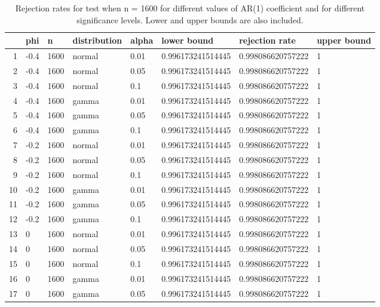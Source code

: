 \begin{table}[ht]
\centering
\caption{Rejection rates for test when n = 1600 for 
                   different values of AR(1) coefficient and for different 
                   significance levels. Lower and upper bounds are also 
                   included.} 
\label{table:rr_1600}
\begin{tabular}{rlllllll}
  \hline
 & phi & n & distribution & alpha & lower bound & rejection rate & upper bound \\ 
  \hline
1 & -0.4 & 1600 & normal & 0.01 & 0.996173241514445 & 0.998086620757222 & 1 \\ 
  2 & -0.4 & 1600 & normal & 0.05 & 0.996173241514445 & 0.998086620757222 & 1 \\ 
  3 & -0.4 & 1600 & normal & 0.1 & 0.996173241514445 & 0.998086620757222 & 1 \\ 
  4 & -0.4 & 1600 & gamma & 0.01 & 0.996173241514445 & 0.998086620757222 & 1 \\ 
  5 & -0.4 & 1600 & gamma & 0.05 & 0.996173241514445 & 0.998086620757222 & 1 \\ 
  6 & -0.4 & 1600 & gamma & 0.1 & 0.996173241514445 & 0.998086620757222 & 1 \\ 
  7 & -0.2 & 1600 & normal & 0.01 & 0.996173241514445 & 0.998086620757222 & 1 \\ 
  8 & -0.2 & 1600 & normal & 0.05 & 0.996173241514445 & 0.998086620757222 & 1 \\ 
  9 & -0.2 & 1600 & normal & 0.1 & 0.996173241514445 & 0.998086620757222 & 1 \\ 
  10 & -0.2 & 1600 & gamma & 0.01 & 0.996173241514445 & 0.998086620757222 & 1 \\ 
  11 & -0.2 & 1600 & gamma & 0.05 & 0.996173241514445 & 0.998086620757222 & 1 \\ 
  12 & -0.2 & 1600 & gamma & 0.1 & 0.996173241514445 & 0.998086620757222 & 1 \\ 
  13 & 0 & 1600 & normal & 0.01 & 0.996173241514445 & 0.998086620757222 & 1 \\ 
  14 & 0 & 1600 & normal & 0.05 & 0.996173241514445 & 0.998086620757222 & 1 \\ 
  15 & 0 & 1600 & normal & 0.1 & 0.996173241514445 & 0.998086620757222 & 1 \\ 
  16 & 0 & 1600 & gamma & 0.01 & 0.996173241514445 & 0.998086620757222 & 1 \\ 
  17 & 0 & 1600 & gamma & 0.05 & 0.996173241514445 & 0.998086620757222 & 1 \\ 

\end{tabular}
\end{table}
